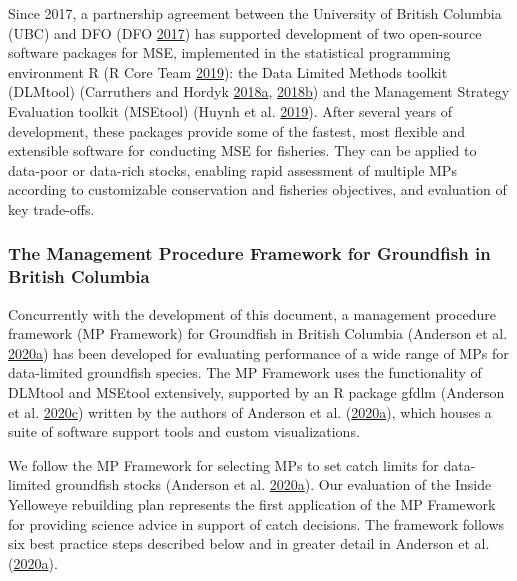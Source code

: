 \documentclass[11pt]{book}
\begin{document}
Since 2017, a partnership agreement between the University of British Columbia (UBC) and DFO (DFO \protect\hyperlink{ref-dfo_dlmtool_2017}{2017}) has supported development of two open-source software packages for MSE, implemented in the statistical programming environment R (R Core Team \protect\hyperlink{ref-r2019}{2019}): the Data Limited Methods toolkit (DLMtool) (Carruthers and Hordyk \protect\hyperlink{ref-carruthers2018}{2018}\protect\hyperlink{ref-carruthers2018}{a}, \protect\hyperlink{ref-carruthers_hordyk_2018}{2018}\protect\hyperlink{ref-carruthers_hordyk_2018}{b}) and the Management Strategy Evaluation toolkit (MSEtool) (Huynh et al. \protect\hyperlink{ref-huynh_msetool_2019}{2019}). After several years of development, these packages provide some of the fastest, most flexible and extensible software for conducting MSE for fisheries. They can be applied to data-poor or data-rich stocks, enabling rapid assessment of multiple MPs according to customizable conservation and fisheries objectives, and evaluation of key trade-offs.

\hypertarget{sec:introduction-mp-framework}{%
\subsubsection{The Management Procedure Framework for Groundfish in British Columbia}\label{sec:introduction-mp-framework}}

Concurrently with the development of this document, a management procedure framework (MP Framework) for Groundfish in British Columbia (Anderson et al. \protect\hyperlink{ref-anderson2020gfmp}{2020}\protect\hyperlink{ref-anderson2020gfmp}{a}) has been developed for evaluating performance of a wide range of MPs for data-limited groundfish species. The MP Framework uses the functionality of DLMtool and MSEtool extensively, supported by an R package gfdlm (Anderson et al. \protect\hyperlink{ref-gfdlm}{2020}\protect\hyperlink{ref-gfdlm}{c}) written by the authors of Anderson et al. (\protect\hyperlink{ref-anderson2020gfmp}{2020}\protect\hyperlink{ref-anderson2020gfmp}{a}), which houses a suite of software support tools and custom visualizations.

We follow the MP Framework for selecting MPs to set catch limits for data-limited groundfish stocks (Anderson et al. \protect\hyperlink{ref-anderson2020gfmp}{2020}\protect\hyperlink{ref-anderson2020gfmp}{a}). Our evaluation of the Inside Yelloweye rebuilding plan represents the first application of the MP Framework for providing science advice in support of catch decisions. The framework follows six best practice steps described below and in greater detail in Anderson et al. (\protect\hyperlink{ref-anderson2020gfmp}{2020}\protect\hyperlink{ref-anderson2020gfmp}{a}).
\end{document}
